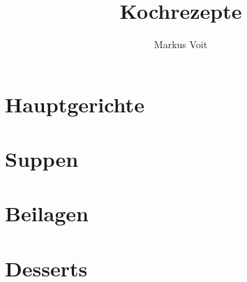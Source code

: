 \documentclass[DIV=11, pagesize, fontsize=11pt, paper=a4, numbers=noenddot]{scrartcl}
\title{Kochrezepte}
\author{Markus Voit}
\begin{document}
\maketitle

\tableofcontents
\clearpage

\section{Hauptgerichte}
\newpage{}
\newpage{}
\newpage{}
\newpage{}
\newpage{}
\newpage{}
\newpage{}
\newpage{}
\newpage{}
\newpage{}
\newpage{}
\newpage{}
\newpage{}
\newpage{}
\newpage{}
\newpage{}
\newpage{}
\newpage{}
\newpage{}

\section{Suppen}
\newpage{}
\newpage{}

\section{Beilagen}
\newpage{}
\newpage{}
\newpage{}
\newpage{}

\section{Desserts}
\newpage{}
\newpage{}
\newpage{}
\newpage{}
\newpage{}
\newpage{}
\end{document}
